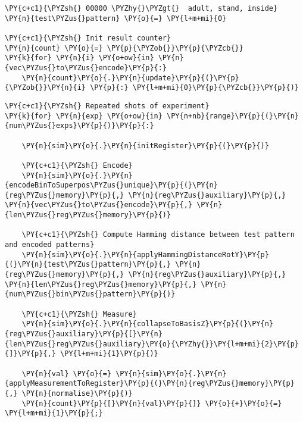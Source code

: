     \begin{tcolorbox}[breakable, size=fbox, boxrule=1pt, pad at break*=1mm,colback=cellbackground, colframe=cellborder]
\begin{Verbatim}[commandchars=\\\{\}]
\PY{c+c1}{\PYZsh{} 00000 \PYZhy{}\PYZgt{}  adult, stand, inside}
\PY{n}{test\PYZus{}pattern} \PY{o}{=} \PY{l+m+mi}{0}

\PY{c+c1}{\PYZsh{} Init result counter}
\PY{n}{count} \PY{o}{=} \PY{p}{\PYZob{}}\PY{p}{\PYZcb{}}
\PY{k}{for} \PY{n}{i} \PY{o+ow}{in} \PY{n}{vec\PYZus{}to\PYZus{}encode}\PY{p}{:}
    \PY{n}{count}\PY{o}{.}\PY{n}{update}\PY{p}{(}\PY{p}{\PYZob{}}\PY{n}{i} \PY{p}{:} \PY{l+m+mi}{0}\PY{p}{\PYZcb{}}\PY{p}{)}
\end{Verbatim}
\end{tcolorbox}

    \begin{tcolorbox}[breakable, size=fbox, boxrule=1pt, pad at break*=1mm,colback=cellbackground, colframe=cellborder]
\begin{Verbatim}[commandchars=\\\{\}]
\PY{c+c1}{\PYZsh{} Repeated shots of experiment}
\PY{k}{for} \PY{n}{exp} \PY{o+ow}{in} \PY{n+nb}{range}\PY{p}{(}\PY{n}{num\PYZus{}exps}\PY{p}{)}\PY{p}{:}

    \PY{n}{sim}\PY{o}{.}\PY{n}{initRegister}\PY{p}{(}\PY{p}{)}

    \PY{c+c1}{\PYZsh{} Encode}
    \PY{n}{sim}\PY{o}{.}\PY{n}{encodeBinToSuperpos\PYZus{}unique}\PY{p}{(}\PY{n}{reg\PYZus{}memory}\PY{p}{,} \PY{n}{reg\PYZus{}auxiliary}\PY{p}{,} \PY{n}{vec\PYZus{}to\PYZus{}encode}\PY{p}{,} \PY{n}{len\PYZus{}reg\PYZus{}memory}\PY{p}{)}

    \PY{c+c1}{\PYZsh{} Compute Hamming distance between test pattern and encoded patterns}
    \PY{n}{sim}\PY{o}{.}\PY{n}{applyHammingDistanceRotY}\PY{p}{(}\PY{n}{test\PYZus{}pattern}\PY{p}{,} \PY{n}{reg\PYZus{}memory}\PY{p}{,} \PY{n}{reg\PYZus{}auxiliary}\PY{p}{,} \PY{n}{len\PYZus{}reg\PYZus{}memory}\PY{p}{,} \PY{n}{num\PYZus{}bin\PYZus{}pattern}\PY{p}{)}

    \PY{c+c1}{\PYZsh{} Measure}
    \PY{n}{sim}\PY{o}{.}\PY{n}{collapseToBasisZ}\PY{p}{(}\PY{n}{reg\PYZus{}auxiliary}\PY{p}{[}\PY{n}{len\PYZus{}reg\PYZus{}auxiliary}\PY{o}{\PYZhy{}}\PY{l+m+mi}{2}\PY{p}{]}\PY{p}{,} \PY{l+m+mi}{1}\PY{p}{)}
    
    \PY{n}{val} \PY{o}{=} \PY{n}{sim}\PY{o}{.}\PY{n}{applyMeasurementToRegister}\PY{p}{(}\PY{n}{reg\PYZus{}memory}\PY{p}{,} \PY{n}{normalise}\PY{p}{)}
    \PY{n}{count}\PY{p}{[}\PY{n}{val}\PY{p}{]} \PY{o}{+}\PY{o}{=} \PY{l+m+mi}{1}\PY{p}{;}
\end{Verbatim}
\end{tcolorbox}

